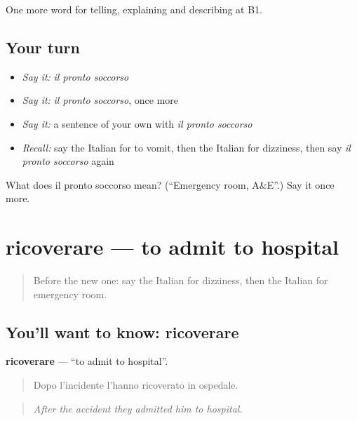 \begin{grammarlens}[title={What you've built}]
One more word for telling, explaining and describing at B1.
\end{grammarlens}

\subsection*{Your turn}
\begin{itemize}
\raggedright
  \item \emph{Say it:} \emph{il pronto soccorso}
  \item \emph{Say it:} \emph{il pronto soccorso}, once more
  \item \emph{Say it:} a sentence of your own with \emph{il pronto soccorso}
  \item \emph{Recall:} say the Italian for to vomit, then the Italian for dizziness, then say \emph{il pronto soccorso} again
\end{itemize}

\begin{tcolorbox}[breakable,colback=teal!4,colframe=teal!35!black,title={Before you move on}]
What does il pronto soccorso mean? (\textquotedblleft{}Emergency room, A\&E\textquotedblright{}.) Say it once more.
\end{tcolorbox}
\section[ricoverare]{ricoverare — to admit to hospital}

\label{lesson:IT-C488-ricoverare}



\begin{quote}
Before the new one: say the Italian for dizziness, then the Italian for emergency room.
\end{quote}

\subsection*{You'll want to know: ricoverare}
\textbf{ricoverare} — \textquotedblleft{}to admit to hospital\textquotedblright{}.

\begin{quote}
Dopo l'incidente l'hanno ricoverato in ospedale.
\end{quote}

\begin{quote}
\emph{After the accident they admitted him to hospital.}
\end{quote}

